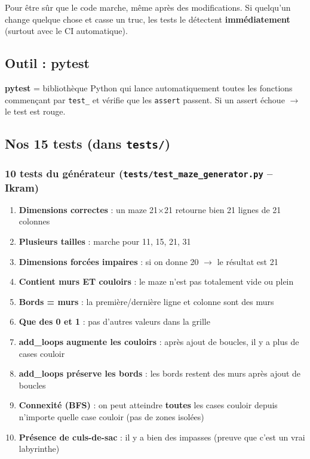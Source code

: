 \documentclass[12pt,a4paper]{article}
\begin{document}
Pour être sûr que le code marche, même après des modifications. Si quelqu'un change quelque chose et casse un truc, les tests le détectent \textbf{immédiatement} (surtout avec le CI automatique).

\subsection{Outil : pytest}

\begin{definitionbox}
\textbf{pytest} = bibliothèque Python qui lance automatiquement toutes les fonctions commençant par \texttt{test\_} et vérifie que les \texttt{assert} passent. Si un assert échoue $\rightarrow$ le test est rouge.
\end{definitionbox}

\subsection{Nos 15 tests (dans \texttt{tests/})}

\subsubsection{10 tests du générateur (\texttt{tests/test\_maze\_generator.py} -- Ikram)}

\begin{enumerate}
    \item \textbf{Dimensions correctes} : un maze 21$\times$21 retourne bien 21 lignes de 21 colonnes
    \item \textbf{Plusieurs tailles} : marche pour 11, 15, 21, 31
    \item \textbf{Dimensions forcées impaires} : si on donne 20 $\rightarrow$ le résultat est 21
    \item \textbf{Contient murs ET couloirs} : le maze n'est pas totalement vide ou plein
    \item \textbf{Bords = murs} : la première/dernière ligne et colonne sont des murs
    \item \textbf{Que des 0 et 1} : pas d'autres valeurs dans la grille
    \item \textbf{add\_loops augmente les couloirs} : après ajout de boucles, il y a plus de cases couloir
    \item \textbf{add\_loops préserve les bords} : les bords restent des murs après ajout de boucles
    \item \textbf{Connexité (BFS)} : on peut atteindre \textbf{toutes} les cases couloir depuis n'importe quelle case couloir (pas de zones isolées)
    \item \textbf{Présence de culs-de-sac} : il y a bien des impasses (preuve que c'est un vrai labyrinthe)
\end{enumerate}
\end{document}
